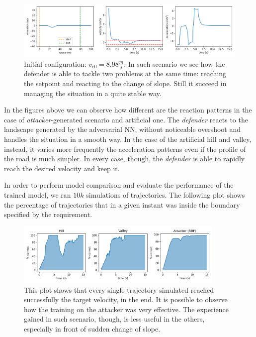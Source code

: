 \begin{figure}[H]
	\centering
	\includegraphics[width=13.8cm, keepaspectratio]{img/5_2_triplot_down.png}
	\caption{Initial configuration: $v_{c0}=8.98 \frac{m}{s}$. In such scenario we see how the defender is able to tackle two problems at the same time: reaching the setpoint and reacting to the change of slope. Still it succeed in managing the situation in a quite stable way.}
    \label{fig:cruise_down}
\end{figure}
In the figures above we can observe how different are the reaction patterns in the case of \textit{attacker}-generated scenario and artificial one.
The \textit{defender} reacts to the landscape generated by the adversarial NN, without noticeable overshoot and handles the situation in a smooth way.
In the case of the artificial hill and valley, instead, it varies more frequently the acceleration patterns even if the profile of the road is much simpler.
In every case, though, the \textit{defender} is able to rapidly reach the desired velocity and keep it. 

In order to perform model comparison and evaluate the performance of the trained model, we ran $10k$ simulations of trajectories.
The following plot shows the percentage of  trajectories that in a given instant was inside the boundary specified by the requirement.

\begin{figure}[H]
	\centering
	\includegraphics[width=10cm, keepaspectratio]{img/5_2_pct_histogram.png}
	\caption{This plot shows that every single trajectory simulated reached successfully the target velocity, in the end. It is possible to observe how the training on the attacker was very effective. The experience gained in such scenario, though, is less useful in the others, especially in front of sudden change of slope.}
    \label{fig:cruise_pct}
\end{figure}

